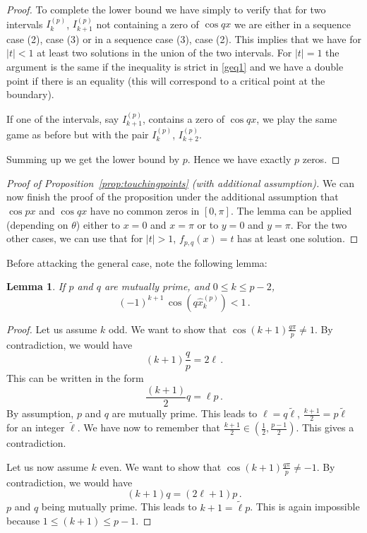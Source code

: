 \documentclass[a4paper,reqno,11pt]{amsart}
\newtheorem{lemma}[thm]{Lemma}
\theoremstyle{remark}
\theoremstyle{definition}
\numberwithin{equation}{section}
\begin{document}
\begin{proof}
To complete the lower bound we have simply to verify that for two 
intervals $I_k^{(p)}$, $I_{k+1}^{(p)}$
not containing a zero of $\cos qx$ we are  either in a sequence case (2), 
case (3) or in a sequence case (3), case (2). This implies that we have  for $|t| < 1$
at least two solutions in the union of the two intervals. For $|t|=1$ the argument is the same if the inequality is strict in \eqref{geq1} and we have a double point if there is an equality (this will correspond to a critical point at the boundary).

If one of the intervals, say $I_{k+1}^{(p)}$, contains a zero of $\cos qx$, 
we play the same game as before but with the pair $I_k^{(p)}$, $I_{k+2}^{(p)}$.

Summing up we get the lower bound by $p$.
Hence we have exactly $p$ zeros. 
\end{proof}

\begin{proof}[Proof of Proposition~\ref{prop:touchingpoints} (with additional assumption)]
We can now finish the proof of the proposition under the additional assumption that $\cos px$ and $\cos qx$ have no common zeros in $ [0,\pi]$. The lemma can be 
applied (depending on $\theta$) either to $x=0$ and $x=\pi$ or to $y=0$ and 
$y=\pi$. For the two other cases, we can use that for $|t| >1$, $f_{p,q}(x)=t$ 
has at least one solution.
\end{proof}

Before attacking the general case, note the following lemma:
\begin{lemma}
If $p$ and $q$ are mutually prime, and $0 \leq  k \leq p-2$,
\[
(-1)^{k+1}\, \cos (q \hat x_k^{(p)})  < 1\,.
\]
\end{lemma}

\begin{proof}
Let us assume $k$ odd. We want to show that $\cos  (k+1) \frac{q\pi}{p} \neq 1$. 
By contradiction, we would have
\[
(k+1) \frac{q}{p} = 2 \ell\,.
\]
This can be written in the form
\[
\frac{(k+1) }{2} q = \ell p\,.
\]
By assumption, $p$ and $q$ are mutually prime. This leads to 
$\ell = q \tilde \ell$, $\frac{k+1}{2} = p \tilde \ell$ for an integer 
$\tilde \ell$. We have now to remember that
$\frac{k+1}{2} \in (\frac 12, \frac{p-1}{2})$. This gives a contradiction.

Let us now assume $k$ even. We want to show that 
$\cos  (k+1) \frac{q\pi}{p} \neq -1$. By contradiction, we would have
\[ 
(k+1) q = (2 \ell +1) p\,.
\]
$p$ and $q$ being mutually prime.  This leads to $k+1 = \tilde \ell p$. This is 
again impossible because $1 \leq (k+1)\leq p-1$. 
\end{proof}
\end{document}
